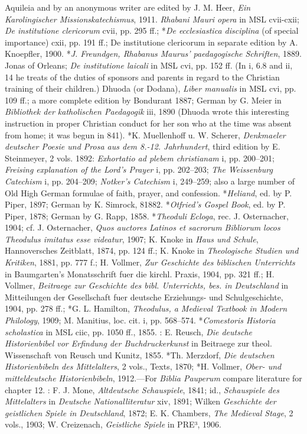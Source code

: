 Aquileia and by an anonymous writer are edited by J. M. Heer, \emph{Ein Karolingischer Missionskatechismus}, 1911. \emph{Rhabani Mauri opera} in MSL cvii-cxii; \emph{De institutione clericorum} cvii, pp. 295 ff.; *\emph{De ecclesiastica disciplina} (of special importance) cxii, pp. 191 ff.; De institutione clericorum in separate edition by A. Knoepfler, 1900. *\emph{J. Freundgen, Rhabanus Maurus’ paedagogische Schriften}, 1889. Jonas of Orleans; \emph{De institutione laicali} in MSL cvi, pp. 152 ff. (In i, 6.8 and ii, 14 he treats of the duties of sponsors and parents in regard to the Christian training of their children.) Dhuoda (or Dodana), \emph{Liber manualis} in MSL cvi, pp. 109 ff.; a more complete edition by Bondurant 1887; German by G. Meier in \emph{Bibliothek der katholischen Paedagogik} iii, 1890 (Dhuoda wrote this interesting instruction in proper Christian conduct for her son who at the time was absent from home; it was begun in 841). *K. Muellenhoff u. W. Scherer, \emph{Denkmaeler deutscher Poesie und Prosa aus dem 8.-12. Jahrhundert}, third edition by E. Steinmeyer, 2 vols. 1892: \emph{Exhortatio ad plebem christianam} i, pp. 200–201; \emph{Freising explanation of the Lord’s Prayer} i, pp. 202–203; \emph{The Weissenburg Catechism} i, pp. 204–209; \emph{Notker’s Catechism} i, 249–259; also a large number of Old High German formulae of faith, prayer, and confession. *\emph{Heliand}, ed. by P. Piper, 1897; German by K. Simrock, 81882. *\emph{Otfried’s Gospel Book}, ed. by P. Piper, 1878; German by G. Rapp, 1858. *\emph{Theoduli Ecloga}, rec. J. Osternacher, 1904; cf. J. Osternacher, \emph{Quos auctores Latinos et sacrorum Bibliorum locos Theodulus imitatus esse videatur}, 1907; K. Knoke in \emph{Haus und Schule}, Hannoversches Zeitblatt, 1874, pp. 124 ff.; K. Knoke in \emph{Theologische Studien und Kritiken}, 1881, pp. 777 f.; H. Vollmer, \emph{Zur Geschichte des biblischen Unterrichts} in Baumgarten’s Monatsschrift fuer die kirchl. Praxis, 1904, pp. 321 ff.; H. Vollmer, \emph{Beitraege zur Geschichte des bibl. Unterrichts, bes. in Deutschland} in Mitteilungen der Gesellschaft fuer deutsche Erziehungs- und Schulgeschichte, 1904, pp. 278 ff.; *G. L. Hamilton, \emph{Theodulus, a Medieval Textbook in Modern Philology}, 1909; M. Manitius, loc. cit. i, pp. 568–574. *\emph{Comestoris Historia scholastica} in MSL ciic, pp. 1050 ff., 1855. : E. Reusch, \emph{Die deutsche Historienbibel vor Erfindung der Buchdruckerkunst} in Beitraege zur theol. Wissenschaft von Reusch und Kunitz, 1855. *Th. Merzdorf, \emph{Die deutschen Historienbibeln des Mittelalters}, 2 vols., Texts, 1870; *H. Vollmer, \emph{Ober- und mitteldeutsche Historienbibeln}, 1912.—For \emph{Biblia Pauperum} compare literature for chapter 12. : F. J. Mone, \emph{Altdeutsche Schauspiele}, 1841; id., \emph{Schauspiele des Mittelalters} in \emph{Deutsche Nationalliteratur}
xiv, 1891; Wilken \emph{Geschichte der geistlichen Spiele in Deutschland}, 1872; E. K. Chambers, \emph{The Medieval Stage}, 2 vols., 1903; W. Creizenach, \emph{Geistliche Spiele} in PRE³, 1906.

